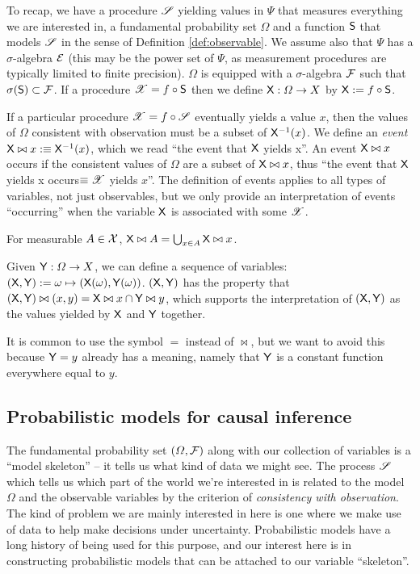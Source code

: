 To recap, we have a procedure $\mathscr{S}$ yielding values in $\Psi$ that measures everything we are interested in, a fundamental probability set $\Omega$ and a function $\mathsf{S}$ that models $\mathscr{S}$ in the sense of Definition \ref{def:observable}. We assume also that $\Psi$ has a $\sigma$-algebra $\mathcal{E}$ (this may be the power set of $\Psi$, as measurement procedures are typically limited to finite precision). $\Omega$ is equipped with a $\sigma$-algebra $\mathcal{F}$ such that $\sigma(\mathsf{S})\subset \mathcal{F}$. If a procedure $\mathscr{X}=f\circ \mathsf{S}$ then we define $\mathsf{X}:\Omega\to X$ by $\mathsf{X}:=f\circ\mathsf{S}$.

If a particular procedure $\mathscr{X}=f\circ \mathscr{S}$ eventually yields a value $x$, then the values of $\Omega$ consistent with observation must be a subset of $\mathsf{X}^{-1}(x)$. We define an \emph{event} $\mathsf{X}\bowtie x:\equiv \mathsf{X}^{-1}(x)$, which we read ``the event that $\mathsf{X}$ yields x''. An event $\mathsf{X}\bowtie x$ occurs if the consistent values of $\Omega$ are a subset of $\mathsf{X}\bowtie x$, thus ``the event that $\mathsf{X}$ yields x occurs$\equiv \mathscr{X}$ yields $x$''. The definition of events applies to all types of variables, not just observables, but we only provide an interpretation of events ``occurring'' when the variable $\mathsf{X}$ is associated with some $\mathscr{X}$.

For measurable $A\in \mathcal{X}$, $\mathsf{X}\bowtie A=\bigcup_{x\in A} \mathsf{X}\bowtie x$. 

Given $\mathsf{Y}:\Omega\to X$, we can define a sequence of variables: $(\mathsf{X},\mathsf{Y}):=\omega\mapsto (\mathsf{X}(\omega),\mathsf{Y}(\omega))$. $(\mathsf{X},\mathsf{Y})$ has the property that $(\mathsf{X},\mathsf{Y})\bowtie (x,y)= \mathsf{X}\bowtie x\cap \mathsf{Y}\bowtie y$, which supports the interpretation of $(\mathsf{X},\mathsf{Y})$ as the values yielded by $\mathsf{X}$ and $\mathsf{Y}$ together.

It is common to use the symbol $=$ instead of $\bowtie$, but we want to avoid this because $\mathsf{Y}=y$ already has a meaning, namely that $\mathsf{Y}$ is a constant function everywhere equal to $y$. 

\subsection{Probabilistic models for causal inference}

The fundamental probability set $(\Omega,\mathcal{F})$ along with our collection of variables is a ``model skeleton'' -- it tells us what kind of data we might see. The process $\mathscr{S}$ which tells us which part of the world we're interested in is related to the model $\Omega$ and the observable variables by the criterion of \emph{consistency with observation}. The kind of problem we are mainly interested in here is one where we make use of data to help make decisions under uncertainty. Probabilistic models have a long history of being used for this purpose, and our interest here is in constructing probabilistic models that can be attached to our variable ``skeleton''. 

